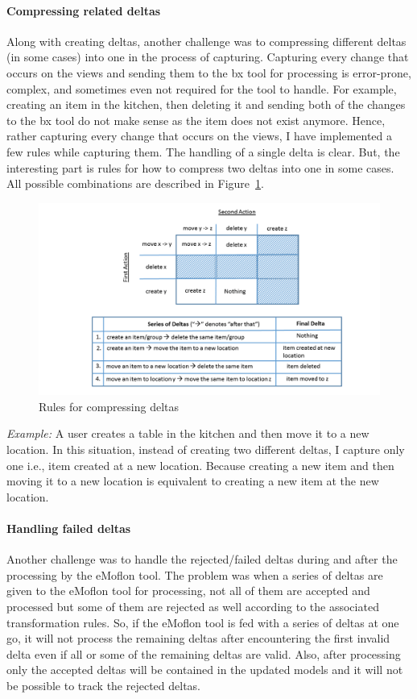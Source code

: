 \paragraph{Compressing related deltas}
Along with creating deltas, another challenge was to compressing different deltas (in some cases) into one in the process of capturing. Capturing every change that occurs on the views and sending them to the bx tool for processing is error-prone, complex, and sometimes even not required for the tool to handle. For example, creating an item in the kitchen, then deleting it and sending both of the changes to the bx tool do not make sense as the item does not exist anymore. Hence, rather capturing every change that occurs on the views, I have implemented a few rules while capturing them. The handling of a single delta is clear. But, the interesting part is rules for how to compress two deltas into one in some cases. All possible combinations are described in Figure~\ref{fig:seriesofdeltas}.

\begin{figure}[h]
	\centering
	\includegraphics[width=1\textwidth]{figures/seriesofdeltas}
	\caption{Rules for compressing deltas}
	\label{fig:seriesofdeltas}
\end{figure}

\textit{Example:} A user creates a table in the kitchen and then move it to a new location. In this situation, instead of creating two different deltas, I capture only one i.e., item created at a new location. Because creating a new item and then moving it to a new location is equivalent to creating a new item at the new location.

\paragraph{Handling failed deltas}
Another challenge was to handle the rejected/failed deltas during and after the processing by the eMoflon tool. The problem was when a series of deltas are given to the eMoflon tool for processing, not all of them are accepted and processed but some of them are rejected as well according to the associated transformation rules. So, if the eMoflon tool is fed with a series of deltas at one go, it will not process the remaining deltas after encountering the first invalid delta even if all or some of the remaining deltas are valid. Also, after processing only the accepted deltas will be contained in the updated models and it will not be possible to track the rejected deltas. 

